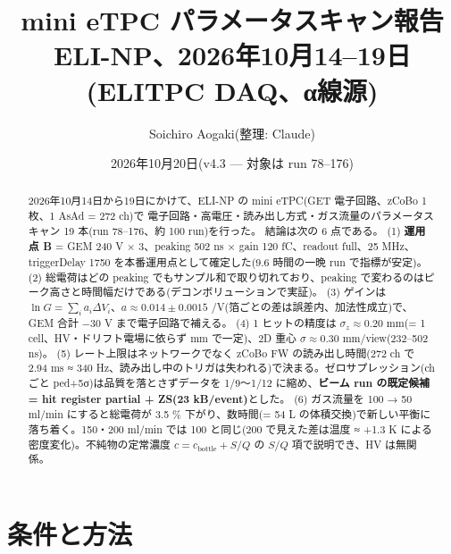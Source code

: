 \documentclass[a4paper,11pt]{ltjsarticle}
\title{mini eTPC パラメータスキャン報告\\[2pt]
\large ELI-NP、2026年10月14--19日(ELITPC DAQ、α線源)}
\author{Soichiro Aogaki(整理: Claude)}
\date{2026年10月20日(v4.3 — 対象は run 78--176)}
\begin{document}
\maketitle

\begin{abstract}
2026年10月14日から19日にかけて、ELI-NP の mini eTPC(GET 電子回路、zCoBo 1 枚、1 AsAd = 272 ch)で
電子回路・高電圧・読み出し方式・ガス流量のパラメータスキャン 19 本(run 78--176、約 100 run)を行った。
結論は次の 6 点である。
(1) \textbf{運用点 B} = GEM 240 V × 3、peaking 502 ns × gain 120 fC、readout full、25 MHz、triggerDelay 1750 を本番運用点として確定した(9.6 時間の一晩 run で指標が安定)。
(2) 総電荷はどの peaking でもサンプル和で取り切れており、peaking で変わるのはピーク高さと時間幅だけである(デコンボリューションで実証)。
(3) ゲインは $\ln G = \sum_i a_i \Delta V_i$、$a \approx 0.014\pm0.0015$ /V(箔ごとの差は誤差内、加法性成立)で、GEM 合計 $-30$ V まで電子回路で補える。
(4) 1 ヒットの精度は $\sigma_z \approx 0.20$ mm(= 1 cell、HV・ドリフト電場に依らず mm で一定)、2D 重心 $\sigma \approx 0.30$ mm/view(232--502 ns)。
(5) レート上限はネットワークでなく zCoBo FW の読み出し時間(272 ch で 2.94 ms ≈ 340 Hz、読み出し中のトリガは失われる)で決まる。ゼロサプレッション(ch ごと ped+5σ)は品質を落とさずデータを 1/9〜1/12 に縮め、\textbf{ビーム run の既定候補 = hit register partial + ZS(23 kB/event)}とした。
(6) ガス流量を 100 → 50 ml/min にすると総電荷が 3.5 \% 下がり、数時間(= 54 L の体積交換)で新しい平衡に落ち着く。150・200 ml/min では 100 と同じ(200 で見えた差は温度 ≈ +1.3 K による密度変化)。不純物の定常濃度 $c = c_\mathrm{bottle} + S/Q$ の $S/Q$ 項で説明でき、HV は無関係。
\end{abstract}

\tableofcontents

\section{条件と方法}
\end{document}
